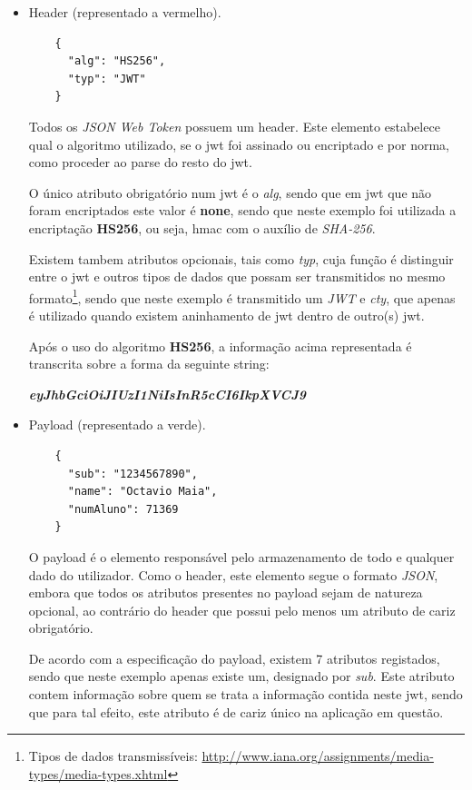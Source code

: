 \begin{itemize}
    \item Header (representado a vermelho).
    \begin{verbatim}
    {
      "alg": "HS256",
      "typ": "JWT"
    }
    \end{verbatim}
    
    Todos os \emph{JSON Web Token} possuem um header. Este elemento estabelece qual o algoritmo utilizado, se o \gls{jwt} foi assinado ou encriptado e por norma, como proceder ao parse do resto do \gls{jwt}.
    
    O único atributo obrigatório num \gls{jwt} é o \emph{alg}, sendo que em \gls{jwt} que não foram encriptados este valor é \textbf{none}, sendo que neste exemplo foi utilizada a encriptação \textbf{HS256}, ou seja, \gls{hmac} com o auxílio de \emph{SHA-256}.
    
    Existem tambem atributos opcionais, tais como \emph{typ}, cuja função é distinguir entre o \gls{jwt} e outros tipos de dados que possam ser transmitidos no mesmo formato\footnote{Tipos de dados transmissíveis: \url{http://www.iana.org/assignments/media-types/media-types.xhtml}}, sendo que neste exemplo é transmitido um \emph{JWT} e \emph{cty}, que apenas é utilizado quando existem aninhamento de \gls{jwt} dentro de outro(s) \gls{jwt}.
    
    Após o uso do algoritmo \textbf{HS256}, a informação acima representada é transcrita sobre a forma da seguinte string:
    
    \begin{center}
        \textbf{\emph{eyJhbGciOiJIUzI1NiIsInR5cCI6IkpXVCJ9}}
    \end{center}
    
    \newpage
    \item Payload (representado a verde).
    \begin{verbatim}
    {
      "sub": "1234567890",
      "name": "Octavio Maia",
      "numAluno": 71369
    }
    \end{verbatim}
    
    O payload é o elemento responsável pelo armazenamento de todo e qualquer dado do utilizador. Como o header, este elemento segue o formato \emph{JSON}, embora que todos os atributos presentes no payload sejam de natureza opcional, ao contrário do header que possui pelo menos um atributo de cariz obrigatório.
    
    De acordo com a especificação do payload, existem 7 atributos registados, sendo que neste exemplo apenas existe um, designado por \emph{sub}. Este atributo contem informação sobre quem se trata a informação contida neste \gls{jwt}, sendo que para tal efeito, este atributo é de cariz único na aplicação em questão.
    

\end{itemize}
